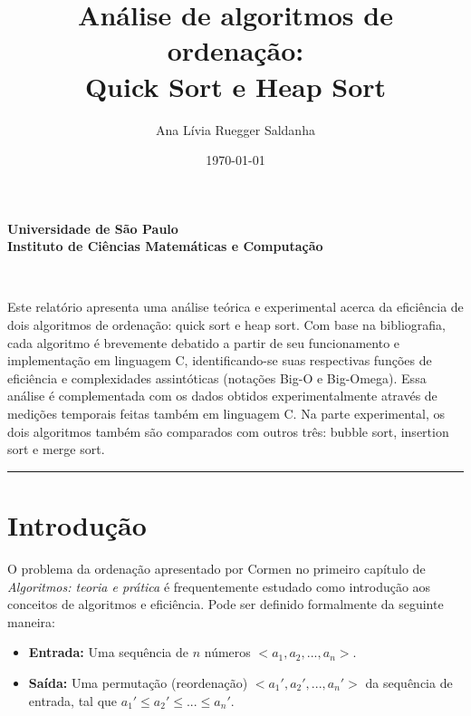 \documentclass[fontsize=10pt]{article}
\title{\Large{Análise de algoritmos de ordenação: \\ [-6pt] Quick Sort e Heap Sort} \\ [10pt]}
\author{Ana Lívia Ruegger Saldanha}
\date{\today}
\makeatletter
\renewenvironment{abstract} %
 {\small
  \begin{center}
  \bfseries \abstractname\vspace{-.5em}\vspace{0pt}
  \end{center}
  \list{}{%
    \setlength{\leftmargin}{0mm}
    \setlength{\rightmargin}{\leftmargin}%
  }
  \item\relax}
 {\endlist}
\renewcommand{\maketitle}{\bgroup\setlength{\parindent}{0pt}%
\begin{center}
    \textbf{
      Universidade de São Paulo\\
      Instituto de Ciências Matemáticas e Computação
    }
\end{center}
\begin{center}
  \textbf{\@title}
  \@author\\
  [3pt] 
  \@date
\end{center}\egroup
}
\makeatother
\begin{document}
\maketitle


\begin{abstract}
    Este relatório apresenta uma análise teórica e experimental acerca da eficiência de dois algoritmos de ordenação: quick sort e heap sort. Com base na bibliografia, cada algoritmo é brevemente debatido a partir de seu funcionamento e implementação em linguagem C, identificando-se suas respectivas funções de eficiência e complexidades assintóticas (notações Big-O e Big-Omega). Essa análise é complementada com os dados obtidos experimentalmente através de medições temporais feitas também em linguagem C. Na parte experimental, os dois algoritmos também são comparados com outros três: bubble sort, insertion sort e merge sort.
    
\end{abstract}

\rule{\linewidth}{0.5pt}

\section{Introdução}
    
    \quad O problema da ordenação apresentado por Cormen no primeiro capítulo de \textit{Algoritmos: teoria e prática} \cite{cormen} é frequentemente estudado como introdução aos conceitos de algoritmos e eficiência. Pode ser definido formalmente da seguinte maneira:
    
    \begin{itemize}
        \item \textbf{Entrada:} Uma sequência de $n$ números $<a_1, a_2, ..., a_n>$.
        \item \textbf{Saída:} Uma permutação (reordenação) $<a_1', a_2', ..., a_n'>$ da sequência de entrada, tal que $a_1' \leq a_2' \leq ... \leq a_n'$.
    \end{itemize}
    
\end{document}
